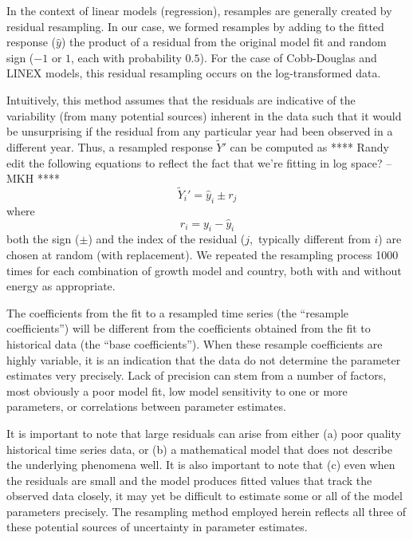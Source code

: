 \documentclass[preprint,authoryear,12pt]{elsarticle}\usepackage[]{graphicx}\usepackage[]{color}
\begin{document}
In the context of linear models (regression), resamples are generally created
by residual resampling.  
In our case, we formed resamples by adding to the fitted 
response ($\hat{y}$) the product of a residual from the original model fit and 
random sign ($-1$ or $1$, each with probability $0.5$).  
For the case of Cobb-Douglas and LINEX models, 
this residual resampling occurs on the 
log-transformed data.

Intuitively, this method assumes that the residuals are indicative of 
the variability (from many potential sources) inherent in the data such that
it would be unsurprising if the residual from 
any particular year had been observed in a different year. 
Thus, a resampled response $\tilde Y'$ can be computed as 
**** Randy edit the following equations to reflect the fact that we're fitting in log space? --MKH ****
%
\begin{equation}
  \tilde Y_i' = \hat y_i \pm r_j
\end{equation}
%
where 
%
\begin{equation}
  r_i = y_i - \hat y_i
\end{equation}
%
both the sign ($\pm$) and the index of the residual 
($j$,~typically different from $i$) 
are chosen at random (with replacement). 
We repeated the resampling process 1000 times for each
combination of growth model and country, 
both with and without energy as appropriate.

The coefficients from the fit to a resampled time series
(the ``resample coefficients'') will be different from the coefficients 
obtained from the fit to historical data (the ``base coefficients'').
When these resample coefficients are highly variable, 
it is an indication
that the data do not determine the parameter estimates very precisely.
Lack of precision can stem from a number of factors, most obviously
a poor model fit, low model sensitivity to one or more parameters, 
or correlations between parameter estimates.

It is important to note that large residuals can arise from either
(a) poor quality historical time series data, or 
(b) a mathematical model that does not describe the underlying phenomena well.
It is also important to note that (c) even when the residuals are small and the 
model produces fitted values that track the observed data closely, it may
yet be difficult to estimate some or all of the model parameters precisely.
The resampling method employed herein reflects all three of these potential 
sources of uncertainty in parameter estimates.
\end{document}
